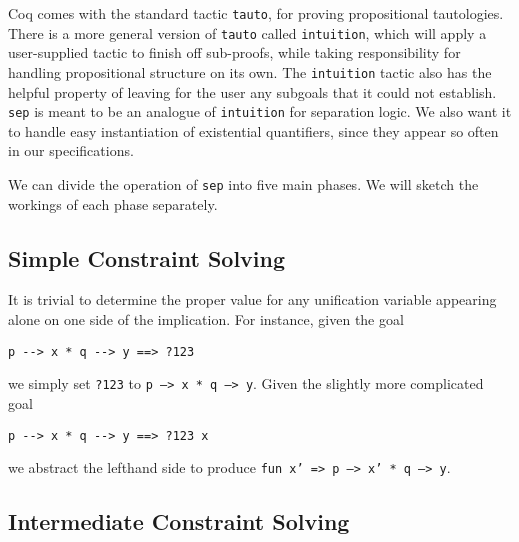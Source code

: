 \documentclass[preprint,nocopyrightspace]{sigplanconf}
\newcommand{\cd}[1]{\texttt{#1}}
\begin{document}
Coq comes with the standard tactic \cd{tauto}, for proving propositional tautologies.  There is a more general version of \cd{tauto} called \cd{intuition}, which will apply a user-supplied tactic to finish off sub-proofs, while taking responsibility for handling propositional structure on its own.  The \cd{intuition} tactic also has the helpful property of leaving for the user any subgoals that it could not establish.  \cd{sep} is meant to be an analogue of \cd{intuition} for separation logic.  We also want it to handle easy instantiation of existential quantifiers, since they appear so often in our specifications.

We can divide the operation of \cd{sep} into five main phases.  We will sketch the workings of each phase separately.

\subsection{Simple Constraint Solving}

It is trivial to determine the proper value for any unification variable appearing alone on one side of the implication.  For instance, given the goal
\begin{verbatim}
p --> x * q --> y ==> ?123
\end{verbatim}
we simply set \cd{?123} to \cd{p --> x * q --> y}.  Given the slightly more complicated goal
\begin{verbatim}
p --> x * q --> y ==> ?123 x
\end{verbatim}
we abstract the lefthand side to produce \cd{fun x' => p --> x' * q --> y}.

\subsection{Intermediate Constraint Solving}
\end{document}
